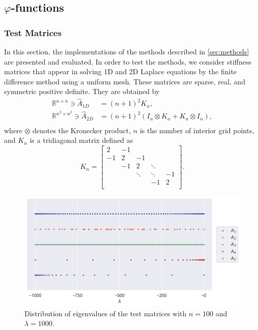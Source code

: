 \subsection{\texorpdfstring{$\varphi$}{Phi}-functions}
\subsubsection*{Test Matrices}
\label{sec:testmatrices}

In this section, the implementations of the methods described in \autoref{sec:methods}
are presented and evaluated. In order to test the methods, we consider stiffness
matrices that appear in solving 1D and 2D Laplace equations by the finite difference
method using a uniform mesh. These matrices are sparse, real, and symmetric positive definite.
They are obtained by
\begin{equation*}
    \begin{aligned}
        \mathbb{R}^{n \times n} \ni \hat{A}_{1D} & = (n+1)^2 K_n,\\
        \mathbb{R}^{n^2 \times n^2} \ni \hat{A}_{2D} & = (n+1)^2  (I_n \otimes K_n + K_n \otimes I_n),\\
        \end{aligned}
\end{equation*}
where $\otimes$ denotes the Kronecker product, $n$ is the number of interior
grid points, and $K_n$ is a tridiagonal matrix defined as
\begin{equation*}
    K_n =
    \begin{bmatrix}
        2 & -1 &  &  &  \\
        -1 & 2 & -1 &  &  \\
         & -1 & 2 & \ddots &  \\
         &  & \ddots & \ddots & -1 \\
         &  &  & -1 & 2  \\
    \end{bmatrix}.
\end{equation*}

\begin{figure}[t!]
    \centering
    \includegraphics[width=.8\textwidth]{img/eigvals.png}
    \caption{
        Distribution of eigenvalues of the test matrices with $n=100$ and
        $\lambda = 1000$.
    }
    \label{fig:eigenvaluedistributions}
\end{figure}

